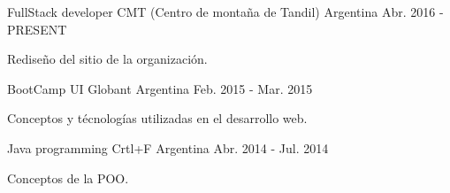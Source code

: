 


\begin{cventries}

\cventry
{FullStack developer} %
{CMT (Centro de montaña de Tandil)} %
{Argentina} %
{Abr. 2016 - PRESENT} %
{ %
\begin{cvitems}
\item {Rediseño del sitio de la organización.}
\end{cvitems}
}




\cventry
{BootCamp UI} %
{Globant} %
{Argentina} %
{Feb. 2015 - Mar. 2015} %
{ %
\begin{cvitems}
\item {Conceptos y técnologías utilizadas en el desarrollo web.}
\end{cvitems}
}


\cventry
{Java programming} %
{Crtl+F} %
{Argentina} %
{Abr. 2014 - Jul. 2014} %
{ %
\begin{cvitems}
\item {Conceptos de la POO.}
\end{cvitems}
}


\end{cventries}
